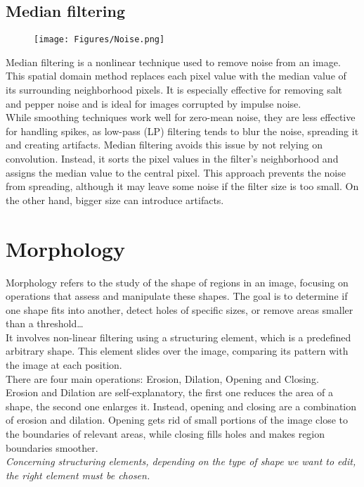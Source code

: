 \subsection{Median filtering}
\begin{figure}[h]
    \centering
    \texttt{[image: Figures/Noise.png]}
    \label{fig:enter-label}
\end{figure}
Median filtering is a nonlinear technique used to remove noise from an image. This spatial domain method replaces each pixel value with the median value of its surrounding neighborhood pixels. 
It is especially effective for removing salt and pepper noise and is ideal for images corrupted by impulse noise.
\\
While smoothing techniques work well for zero-mean noise, they are less effective for handling spikes, as low-pass (LP) filtering tends to blur the noise, spreading it and creating artifacts. 
Median filtering avoids this issue by not relying on convolution. 
Instead, it sorts the pixel values in the filter's neighborhood and assigns the median value to the central pixel. 
This approach prevents the noise from spreading, although it may leave some noise if the filter size is too small. On the other hand, bigger size can introduce artifacts.
\section{Morphology}

Morphology refers to the study of the shape of regions in an image, focusing on operations that assess and manipulate these shapes. The goal is to determine if one shape fits into another, detect holes of specific sizes, or remove areas smaller than a threshold\dots 
\\It involves non-linear filtering using a structuring element, which is a predefined arbitrary shape. This element slides over the image, comparing its pattern with the image at each position.
\\
There are four main operations: Erosion, Dilation, Opening and Closing.\\
Erosion and Dilation are self-explanatory, the first one reduces the area of a shape, the second one enlarges it. Instead, opening and closing are a combination of erosion and dilation. Opening gets rid of small portions of the image close to the boundaries of relevant areas, while closing fills holes and makes region boundaries smoother. 
\\\textit{Concerning structuring elements, depending on the type of shape we want to edit, the right element must be chosen.}
